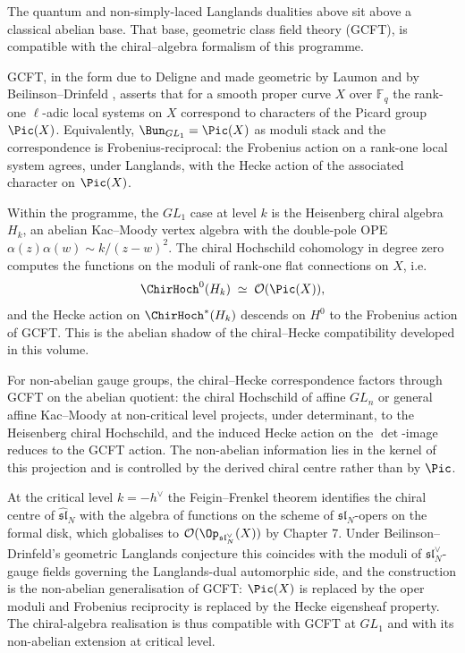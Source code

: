 \begin{remark}
\label{rem:gcft-chiral-compatibility}
The quantum and non-simply-laced Langlands dualities above sit above
a classical abelian base. That base, geometric class field theory
(GCFT), is compatible with the
chiral--algebra formalism of this programme.

GCFT, in the form due to Deligne and made geometric by Laumon
\cite{Laumon90} and by Beilinson--Drinfeld \cite{BD04}, asserts that
for a smooth proper curve $X$ over $\mathbb{F}_q$ the rank-one
$\ell$-adic local systems on $X$ correspond to characters of the
Picard group $\Pic(X)$. Equivalently, $\Bun_{GL_1} = \Pic(X)$ as
moduli stack and the correspondence is Frobenius-reciprocal: the
Frobenius action on a rank-one local system agrees, under Langlands,
with the Hecke action of the associated character on $\Pic(X)$.

Within the programme, the $GL_1$ case at level $k$ is the Heisenberg
chiral algebra $H_k$, an abelian Kac--Moody vertex algebra with the
double-pole OPE $\alpha(z)\alpha(w)\sim k/(z-w)^2$. The chiral
Hochschild cohomology in degree zero computes the functions on the
moduli of rank-one flat connections on $X$, i.e.
\[
 \ChirHoch^0(H_k) \;\simeq\; \mathcal{O}(\Pic(X)),
\]
and the Hecke action on $\ChirHoch^*(H_k)$ descends on $H^0$ to the
Frobenius action of GCFT. This is the abelian shadow of the
chiral--Hecke compatibility developed in this volume.

For non-abelian gauge groups, the chiral--Hecke correspondence factors
through GCFT on the abelian quotient: the chiral Hochschild of affine
$GL_n$ or general affine Kac--Moody at non-critical level projects,
under determinant, to the Heisenberg chiral Hochschild, and the
induced Hecke action on the $\det$-image reduces to the GCFT action.
The non-abelian information lies in the kernel of this projection and
is controlled by the derived chiral centre rather than by $\Pic$.

At the critical level $k = -h^{\vee}$ the Feigin--Frenkel theorem
identifies the chiral centre of $\widehat{\mathfrak{sl}}_N$ with the
algebra of functions on the scheme of $\mathfrak{sl}_N$-opers on the
formal disk, which globalises to $\mathcal{O}(\Op_{\mathfrak{sl}_N^{\vee}}(X))$
by \cite{BD04} Chapter 7. Under Beilinson--Drinfeld's geometric
Langlands conjecture this coincides with the moduli of
$\mathfrak{sl}_N^{\vee}$-gauge fields governing the Langlands-dual
automorphic side, and the construction is the non-abelian
generalisation of GCFT: $\Pic(X)$ is replaced by the oper moduli and
Frobenius reciprocity is replaced by the Hecke eigensheaf property.
The chiral-algebra realisation is thus compatible with GCFT at
$GL_1$ and with its non-abelian extension at critical level.


\end{remark}
